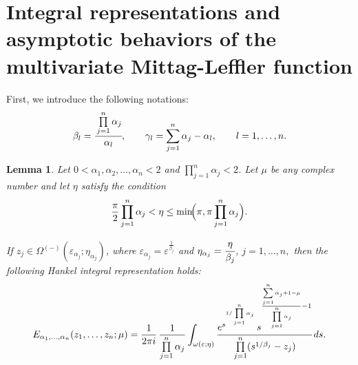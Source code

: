 \documentclass[12pt, reqno]{amsart}
\newtheorem{lemma}[theorem]{Lemma}
\theoremstyle{definition}
\theoremstyle{remark}
\numberwithin{equation}{section}
\begin{document}
\section{Integral representations and asymptotic behaviors of the multivariate Mittag-Leffler function}\label{sec5}
 

First, we introduce the following notations:
$$\beta_l=\cfrac{\prod\limits_{{j=1}}^n\alpha_j}{\alpha_l}, \qquad
\gamma_l=\sum_{j=1}^n\alpha_j-\alpha_l,\qquad l=1,\dots,n.
$$
\begin{lemma}\label{l5.1}
    Let $0 < \alpha_1, \alpha_2,\dots,\alpha_n < 2$ and $\prod\limits_{{j=1}}^n\alpha_j < 2$. Let $\mu$ be any complex number and let $\eta$ satisfy the condition
\begin{equation}\label{5.1}
\frac{\pi}{2}\prod_{{j=1}}^n\alpha_j
<
\eta
\leq
\min\!\Bigl(\pi,\pi\prod_{{j=1}}^n\alpha_j\Bigr).
\end{equation}

If
$
z_j \in \Omega^{(-)}({\varepsilon}_{\alpha_j};\eta_{\alpha_j})
$,
where
$
{\varepsilon}_{\alpha_j}={\varepsilon}^{\frac{1}{\beta_j}}$ and $\eta_{\alpha_j}=\cfrac{\eta}{\beta_j}$, $j=1,\dots,n,$
then the following Hankel integral representation holds:
\begin{equation}\label{multi variable integral representation}
E_{\alpha_1, \dots, \alpha_n }(z_1, \dots, z_n;\mu)
=
\frac{1}{2\pi i}\,
\frac{1}{\prod\limits_{{j=1}}^n\alpha_j}
\int_{\omega(\varepsilon;\eta)}
\cfrac{
e^{s^{1/\prod\limits_{{j=1}}^n\alpha_j}}
\,s^{\frac{\sum\limits_{j=1}^n\alpha_j+1-\mu}{\prod\limits_{j=1}^n\alpha_j}-1}
}
{
\prod\limits_{j=1}^n(s^{1/\beta_j}-z_j)
}
\,ds.
\end{equation}
\end{lemma}
\end{document}

